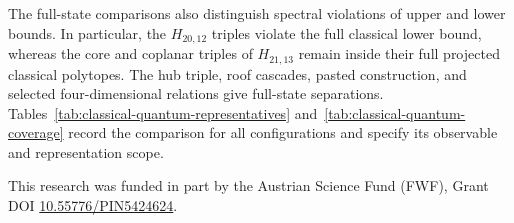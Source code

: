 \documentclass[aps,pra,reprint,superscriptaddress,longbibliography,nofootinbib,floatfix,10pt]{revtex4-2}
\theoremstyle{definition}\newtheorem{definition}[theorem]{Definition}
\theoremstyle{remark}\newtheorem{remark}[theorem]{Remark}
\begin{document}
The full-state comparisons also distinguish spectral violations of upper and lower bounds. In particular, the $H_{20,12}$ triples violate the full classical lower bound, whereas the core and coplanar triples of $H_{21,13}$ remain inside their full projected classical polytopes. The hub triple, roof cascades, pasted construction, and selected four-dimensional relations give full-state separations. Tables~\ref{tab:classical-quantum-representatives} and~\ref{tab:classical-quantum-coverage} record the comparison for all configurations and specify its observable and representation scope.

\begin{acknowledgments}
This research was funded in part by the Austrian Science Fund (FWF), Grant DOI \href{https://doi.org/10.55776/PIN5424624}{10.55776/PIN5424624}.
\end{acknowledgments}


\end{document}
